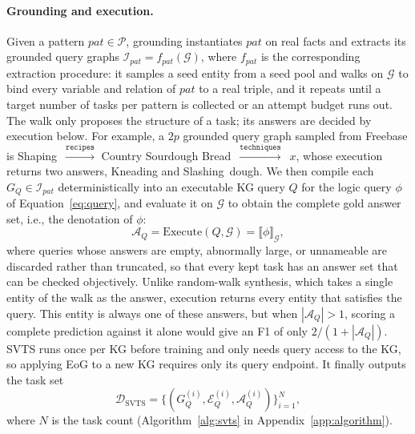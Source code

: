 \paragraph{Grounding and execution.}
Given a pattern $pat\in\mathcal{P}$, grounding instantiates $pat$ on real facts and extracts its grounded query graphs $\mathcal{I}_{pat}=f_{pat}(\mathcal{G})$, where $f_{pat}$ is the corresponding extraction procedure: it samples a seed entity from a seed pool and walks on $\mathcal{G}$ to bind every variable and relation of $pat$ to a real triple, and it repeats until a target number of tasks per pattern is collected or an attempt budget runs out. The walk only proposes the structure of a task; its answers are decided by execution below. For example, a $2p$ grounded query graph sampled from Freebase is Shaping~$\xrightarrow{\texttt{recipes}}$ Country Sourdough Bread~$\xrightarrow{\texttt{techniques}}$~$x$, whose execution returns two answers, Kneading and Slashing~dough. We then compile each $G_Q\in\mathcal{I}_{pat}$ deterministically into an executable KG query $Q$ for the logic query $\phi$ of Equation~\ref{eq:query}, and evaluate it on $\mathcal{G}$ to obtain the complete gold answer set, i.e., the denotation of $\phi$:
\begin{equation}
\label{eq:exec-main}
\mathcal{A}_Q=\mathrm{Execute}(Q,\mathcal{G})=\llbracket\phi\rrbracket_{\mathcal{G}},
\end{equation}
where queries whose answers are empty, abnormally large, or unnameable are discarded rather than truncated, so that every kept task has an answer set that can be checked objectively. Unlike random-walk synthesis, which takes a single entity of the walk as the answer, execution returns every entity that satisfies the query. This entity is always one of these answers, but when $|\mathcal{A}_Q|>1$, scoring a complete prediction against it alone would give an F1 of only $2/(1+|\mathcal{A}_Q|)$. SVTS runs once per KG before training and only needs query access to the KG, so applying EoG to a new KG requires only its query endpoint. It finally outputs the task set
\begin{equation}
\label{eq:dsvts}
\mathcal{D}_{\mathrm{SVTS}}=\bigl\{(G_Q^{(i)},\mathcal{E}_Q^{(i)},\mathcal{A}_Q^{(i)})\bigr\}_{i=1}^{N},
\end{equation}
where $N$ is the task count (Algorithm~\ref{alg:svts} in Appendix~\ref{app:algorithm}).


